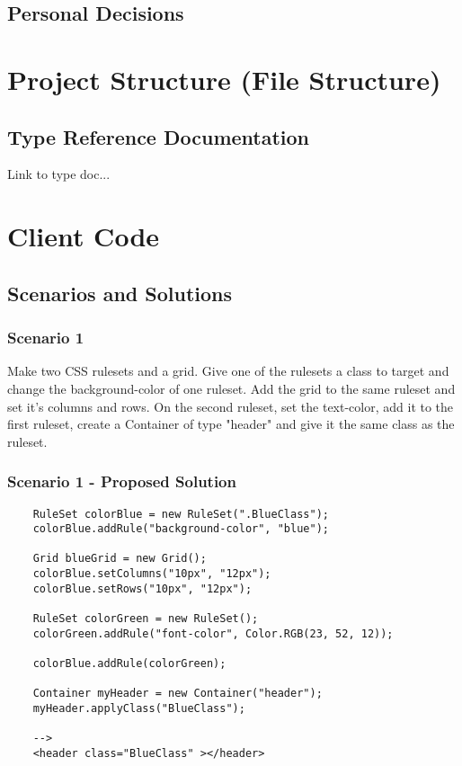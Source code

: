 \documentclass[12pt]{article}
\begin{document}
\subsection{Personal Decisions}

\section{Project Structure (File Structure)}

\subsection{Type Reference Documentation}
Link to type doc...

\section{Client Code}

\subsection{Scenarios and Solutions}

\subsubsection{Scenario 1}
Make two CSS rulesets and a grid. Give one of the rulesets a class to target and change the background-color of one ruleset. Add the grid to the same ruleset and set it's columns and rows. On the second ruleset, set the text-color, add it to the first ruleset, create a Container of type "header" and give it the same class as the ruleset.

\subsubsection{Scenario 1 - Proposed Solution}

\begin{lstlisting}
    RuleSet colorBlue = new RuleSet(".BlueClass");
    colorBlue.addRule("background-color", "blue");

    Grid blueGrid = new Grid();
    colorBlue.setColumns("10px", "12px");
    colorBlue.setRows("10px", "12px");

    RuleSet colorGreen = new RuleSet();
    colorGreen.addRule("font-color", Color.RGB(23, 52, 12));

    colorBlue.addRule(colorGreen);

    Container myHeader = new Container("header");
    myHeader.applyClass("BlueClass");

    -->
    <header class="BlueClass" ></header>
\end{lstlisting}
\end{document}

